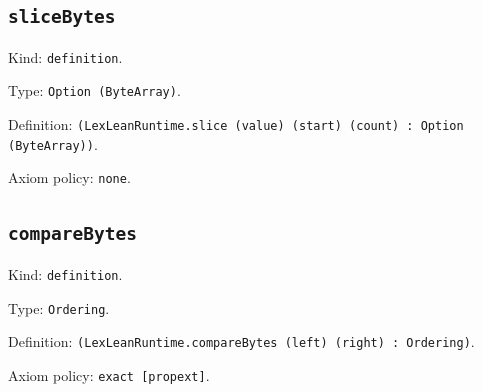 \documentclass[11pt]{article}
\begin{document}
\subsection*{\texttt{sliceBytes}}
\noindent Kind: \texttt{definition}.\par
\noindent Type: \texttt{Option (ByteArray)}.\par
\noindent Definition: \texttt{(LexLeanRuntime.slice (value) (start) (count) : Option (ByteArray))}.\par
\noindent Axiom policy: \texttt{none}.\par
\subsection*{\texttt{compareBytes}}
\noindent Kind: \texttt{definition}.\par
\noindent Type: \texttt{Ordering}.\par
\noindent Definition: \texttt{(LexLeanRuntime.compareBytes (left) (right) : Ordering)}.\par
\noindent Axiom policy: \texttt{exact [propext]}.\par
\end{document}
